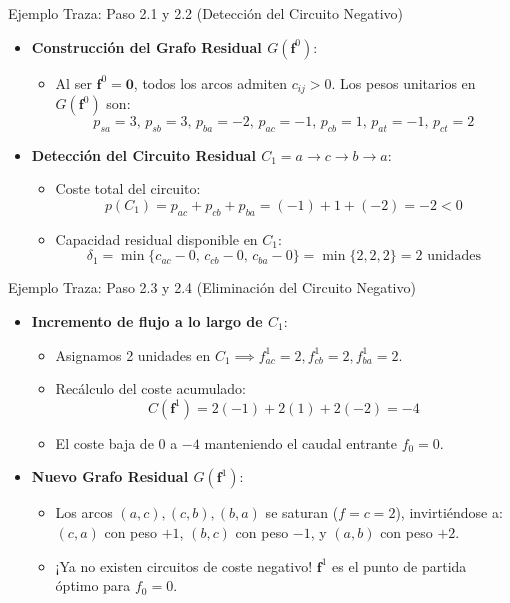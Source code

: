 \documentclass[
  ignorenonframetext,
]{beamer}
\providecommand{\tightlist}{%
  \setlength{\itemsep}{0pt}\setlength{\parskip}{0pt}}
\begin{document}
\begin{frame}{Ejemplo Traza: Paso 2.1 y 2.2 (Detección del Circuito
Negativo)}
\label{ejemplo-traza-paso-2.1-y-2.2-detecciuxf3n-del-circuito-negativo}
\begin{itemize}
\tightlist
\item
  \textbf{Construcción del Grafo Residual \(G(\mathbf{f}^0)\)}:

  \begin{itemize}
  \tightlist
  \item
    Al ser \(\mathbf{f}^0 = \mathbf{0}\), todos los arcos admiten
    \(c_{ij} > 0\). Los pesos unitarios en \(G(\mathbf{f}^0)\) son:
    \[p_{sa}=3, \, p_{sb}=3, \, p_{ba}=-2, \, p_{ac}=-1, \, p_{cb}=1, \, p_{at}=-1, \, p_{ct}=2\]
  \end{itemize}
\item
  \textbf{Detección del Circuito Residual
  \(C_1 = a \to c \to b \to a\)}:

  \begin{itemize}
  \tightlist
  \item
    Coste total del circuito:
    \[p(C_1) = p_{ac} + p_{cb} + p_{ba} = (-1) + 1 + (-2) = -2 < 0\]
  \item
    Capacidad residual disponible en \(C_1\):
    \[\delta_1 = \min \{ c_{ac} - 0, \, c_{cb} - 0, \, c_{ba} - 0 \} = \min \{2, 2, 2\} = 2 \text{ unidades}\]
  \end{itemize}
\end{itemize}
\end{frame}

\begin{frame}{Ejemplo Traza: Paso 2.3 y 2.4 (Eliminación del Circuito
Negativo)}
\label{ejemplo-traza-paso-2.3-y-2.4-eliminaciuxf3n-del-circuito-negativo}
\begin{itemize}
\tightlist
\item
  \textbf{Incremento de flujo a lo largo de \(C_1\)}:

  \begin{itemize}
  \tightlist
  \item
    Asignamos 2 unidades en
    \(C_1 \implies f_{ac}^1 = 2, f_{cb}^1 = 2, f_{ba}^1 = 2\).
  \item
    Recálculo del coste acumulado:
    \[C(\mathbf{f}^1) = 2(-1) + 2(1) + 2(-2) = -4\]
  \item
    El coste baja de \(0\) a \(-4\) manteniendo el caudal entrante
    \(f_0 = 0\).
  \end{itemize}
\item
  \textbf{Nuevo Grafo Residual \(G(\mathbf{f}^1)\)}:

  \begin{itemize}
  \tightlist
  \item
    Los arcos \((a,c), (c,b), (b,a)\) se saturan (\(f=c=2\)),
    invirtiéndose a: \((c,a)\) con peso \(+1\), \((b,c)\) con peso
    \(-1\), y \((a,b)\) con peso \(+2\).
  \item
    ¡Ya no existen circuitos de coste negativo! \(\mathbf{f}^1\) es el
    punto de partida óptimo para \(f_0 = 0\).
  \end{itemize}
\end{itemize}
\end{frame}
\end{document}

